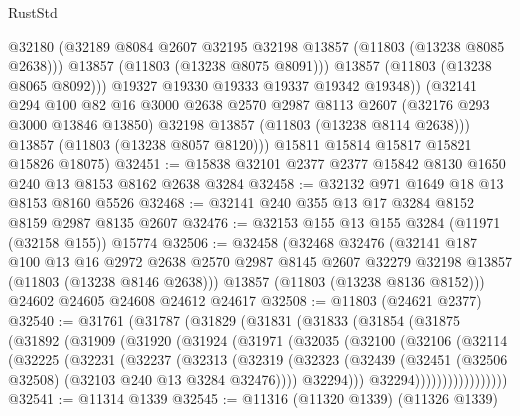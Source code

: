 \begin{lexlean}{RustStd}
\begin{coremodule}
                @32180
                (@32189 @8084 @2607 @32195 @32198 @13857 (@11803 (@13238 @8085 @2638)))
                @13857
                (@11803 (@13238 @8075 @8091)))
              @13857
              (@11803 (@13238 @8065 @8092)))
            @19327
            @19330
            @19333
            @19337
            @19342
            @19348))
        (@32141
          @294
          @100
          @82
          @16
          @3000
          @2638
          @2570
          @2987
          @8113
          @2607
          (@32176 @293 @3000 @13846 @13850)
          @32198
          @13857
          (@11803 (@13238 @8114 @2638)))
        @13857
        (@11803 (@13238 @8057 @8120)))
      @15811
      @15814
      @15817
      @15821
      @15826
      @18075)
@32451 := @15838 @32101 @2377 @2377 @15842 @8130 @1650 @240 @13 @8153 @8162 @2638 @3284
@32458 := @32132 @971 @1649 @18 @13 @8153 @8160 @5526
@32468 := @32141 @240 @355 @13 @17 @3284 @8152 @8159 @2987 @8135 @2607
@32476 := @32153 @155 @13 @155 @3284 (@11971 (@32158 @155)) @15774
@32506 := @32458
    (@32468
      @32476
      (@32141
        @187
        @100
        @13
        @16
        @2972
        @2638
        @2570
        @2987
        @8145
        @2607
        @32279
        @32198
        @13857
        (@11803 (@13238 @8146 @2638)))
      @13857
      (@11803 (@13238 @8136 @8152)))
    @24602
    @24605
    @24608
    @24612
    @24617
@32508 := @11803 (@24621 @2377)
@32540 := @31761
    (@31787
      (@31829
        (@31831
          (@31833
            (@31854
              (@31875
                (@31892
                  (@31909
                    (@31920
                      (@31924
                        (@31971
                          (@32035
                            (@32100
                              (@32106
                                (@32114
                                  (@32225
                                    (@32231
                                      (@32237
                                        (@32313
                                          (@32319
                                            (@32323
                                              (@32439
                                                (@32451
                                                  (@32506 @32508)
                                                  (@32103 @240 @13 @3284 @32476))))
                                            @32294)))
                                      @32294)))))))))))))))))
@32541 := @11314 @1339
@32545 := @11316 (@11320 @1339) (@11326 @1339)

\end{coremodule}
\end{lexlean}
